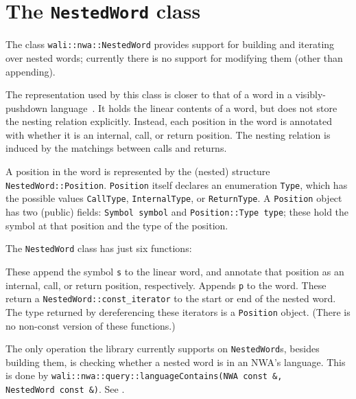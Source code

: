 \section{The \texttt{NestedWord} class}
\label{Se:class-nested-word}

The class \texttt{wali::nwa::NestedWord} provides support for
building and iterating over nested words; currently there
is no support for modifying them (other than appending).

The representation used by this class is closer to that of a word in a
visibly-pushdown language~\cite{JACM:AM2009}. It holds the linear contents of
a word, but does not store the nesting relation explicitly. Instead, each
position in the word is annotated with whether it is an internal, call, or
return position. The nesting relation is induced by the matchings between
calls and returns.

A position in the word is represented by the (nested) structure
\texttt{NestedWord::Position}. \texttt{Position} itself declares an
enumeration \texttt{Type}, which has the possible values \texttt{CallType},
\texttt{InternalType}, or \texttt{ReturnType}.
A \texttt{Position} object has two (public) fields: \texttt{Symbol symbol}
and \texttt{Position::Type type}; these hold the symbol at that position and
the type of the position.


The \texttt{NestedWord} class has just six functions:
\begin{functionlist}
    These append the symbol \texttt{s} to the linear word, and annotate that
    position as an internal, call, or return position, respectively.
    Appends \texttt{p} to the word.
    These return a \texttt{NestedWord::const\_iterator} to the start or end
    of the nested word. The type returned by dereferencing these iterators is
    a \texttt{Position} object. (There is no non-const version of these
    functions.)
\end{functionlist}

The only operation the library currently supports on
\texttt{NestedWord}s, besides building them, is checking whether a
nested word is in an NWA's language. This is done by
\texttt{wali::nwa::query::languageContains(\mbox{NWA const \&}, \mbox{NestedWord const \&})}. See
.

